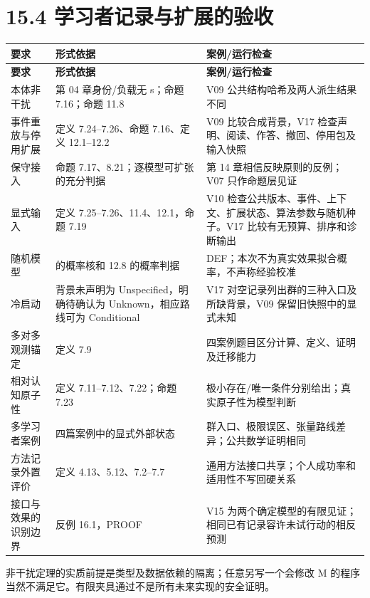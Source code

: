 \documentclass[UTF8,a4paper,zihao=-4,fontset=windows,openany]{ctexbook}
\begin{document}
\section{15.4 学习者记录与扩展的验收}
\begingroup\small\setlength{\tabcolsep}{4pt}
\begin{longtable}{>{\raggedright\arraybackslash}p{}>{\raggedright\arraybackslash}p{}>{\raggedright\arraybackslash}p{}}
\toprule
\textbf{要求} & \textbf{形式依据} & \textbf{案例/运行检查} \\
\midrule
\endfirsthead
\toprule
\textbf{要求} & \textbf{形式依据} & \textbf{案例/运行检查} \\
\midrule
\endhead
\bottomrule
\endfoot
\bottomrule
\endlastfoot
本体非干扰 & 第 04 章身份/负载无 s；命题 7.16；命题 11.8 & V09 公共结构哈希及两人派生结果不同 \\
事件重放与停用扩展 & 定义 7.24–7.26、命题 7.16、定义 12.1–12.2 & V09 比较合成背景，V17 检查声明、阅读、作答、撤回、停用包及输入快照 \\
保守接入 & 命题 7.17、8.21；逐模型可扩张的充分判据 & 第 14 章相信反映原则的反例；V07 只作命题层见证 \\
显式输入 & 定义 7.25–7.26、11.4、12.1，命题 7.19 & V10 检查公共版本、事件、上下文、扩展状态、算法参数与随机种子。V17 比较有无预算、排序和诊断输出 \\
随机模型 & 7.8 的概率核和 12.8 的概率判据 & DEF；本次不为真实效果拟合概率，不声称经验校准 \\
冷启动 & 背景未声明为 Unspecified，明确待确认为 Unknown，相应路线可为 Conditional & V17 对空记录列出群的三种入口及所缺背景，V09 保留旧快照中的显式未知 \\
多对多观测锚定 & 定义 7.9 & 四案例题目区分计算、定义、证明及迁移能力 \\
相对认知原子性 & 定义 7.11–7.12、7.22；命题 7.23 & 极小存在/唯一条件分别给出；真实原子性为模型判断 \\
多学习者案例 & 四篇案例中的显式外部状态 & 群入口、极限误区、张量路线差异；公共数学证明相同 \\
方法记录外置评价 & 定义 4.13、5.12、7.2–7.7 & 通用方法接口共享；个人成功率和适用性不写回硬关系 \\
接口与效果的识别边界 & 反例 16.1，PROOF & V15 为两个确定模型的有限见证；相同已有记录容许未试行动的相反预测 \\
\end{longtable}
\endgroup

非干扰定理的实质前提是类型及数据依赖的隔离；任意另写一个会修改 M 的程序当然不满足它。有限夹具通过不是所有未来实现的安全证明。
\end{document}
